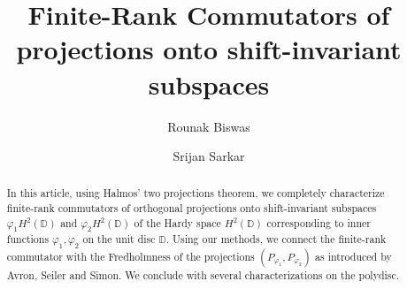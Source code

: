 \documentclass[12pt, a4 paper]{amsart}
\newcommand{\D}{\mathbb{D}}
\theoremstyle{definition}
\theoremstyle{plain}
\theoremstyle{definition}
\numberwithin{equation}{section}
\let\phi=\varphi
\begin{document}
\title[Finite-Rank Commutators]{Finite-Rank Commutators of projections onto shift-invariant subspaces}

\author[Biswas]{Rounak Biswas}
\address{Department of Mathematics, Indian Institute of Technology Palakkad, Kerala - 678623, India.}


\author[Sarkar] {Srijan Sarkar }
\address{Department of Mathematics, Indian Institute of Technology Palakkad, Kerala - 678623, India.}






\begin{abstract}
 In this article, using Halmos' two projections theorem, we completely characterize finite-rank commutators of orthogonal projections onto shift-invariant subspaces $\phi_1 H^2(\D)$ and $\phi_2 H^2(\D)$ of the Hardy space $H^2(\D)$ corresponding to inner functions $\phi_1, \phi_2$ on the unit disc $\D$. Using our methods, we connect the finite-rank commutator with the Fredholmness of the projections $(P_{\phi_1}, P_{\phi_2})$ as introduced by Avron, Seiler and Simon. We conclude with several characterizations on the polydisc.
\end{abstract}

\maketitle
\end{document}
